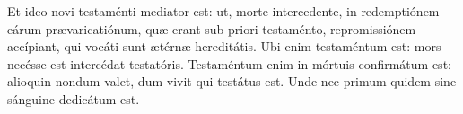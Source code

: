 
Et ideo novi testaménti mediator est: ut, morte intercedente, in redemptiónem eárum prævaricatiónum, quæ erant sub priori testaménto, repromissiónem accípiant, qui vocáti sunt ætérnæ hereditátis.
Ubi enim testaméntum est: mors necésse est intercédat testatóris.
Testaméntum enim in mórtuis confirmátum est: alioquin nondum valet, dum vivit qui testátus est.
Unde nec primum quidem sine sánguine dedicátum est.
\par